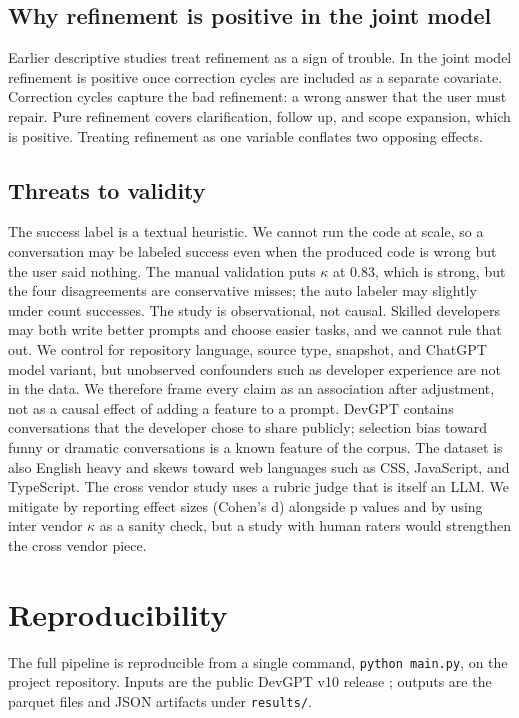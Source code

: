 \documentclass[conference]{IEEEtran}
\begin{document}
\subsection{Why refinement is positive in the joint model}
Earlier descriptive studies treat refinement as a sign of trouble. In the joint model refinement is positive once correction cycles are included as a separate covariate. Correction cycles capture the bad refinement: a wrong answer that the user must repair. Pure refinement covers clarification, follow up, and scope expansion, which is positive. Treating refinement as one variable conflates two opposing effects.

\subsection{Threats to validity}
The success label is a textual heuristic. We cannot run the code at scale, so a conversation may be labeled success even when the produced code is wrong but the user said nothing. The manual validation puts $\kappa$ at 0.83, which is strong, but the four disagreements are conservative misses; the auto labeler may slightly under count successes. The study is observational, not causal. Skilled developers may both write better prompts and choose easier tasks, and we cannot rule that out. We control for repository language, source type, snapshot, and ChatGPT model variant, but unobserved confounders such as developer experience are not in the data. We therefore frame every claim as an association after adjustment, not as a causal effect of adding a feature to a prompt. DevGPT contains conversations that the developer chose to share publicly; selection bias toward funny or dramatic conversations is a known feature of the corpus. The dataset is also English heavy and skews toward web languages such as CSS, JavaScript, and TypeScript. The cross vendor study uses a rubric judge that is itself an LLM. We mitigate by reporting effect sizes (Cohen's d) alongside p values and by using inter vendor $\kappa$ as a sanity check, but a study with human raters would strengthen the cross vendor piece.

\section{Reproducibility}\label{sec:repro}
The full pipeline is reproducible from a single command, \texttt{python main.py}, on the project repository. Inputs are the public DevGPT v10 release \cite{xiao2023devgpt}; outputs are the parquet files and JSON artifacts under \texttt{results/}.
\end{document}
